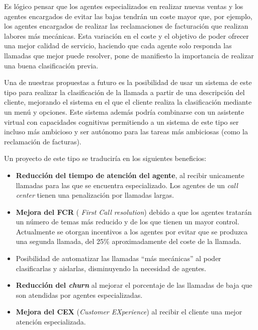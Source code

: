 Es lógico pensar que los agentes especializados en realizar nuevas ventas y los agentes encargados de evitar las bajas tendrán un coste mayor que, por ejemplo, los agentes encargados de realizar las reclamaciones de facturación que realizan labores más mecánicas. Esta variación en el coste y el objetivo de poder ofrecer una mejor calidad de servicio, haciendo que cada agente solo responda las llamadas que mejor puede resolver, pone de manifiesto la importancia de realizar una buena clasificación previa. 

Una de nuestras propuestas a futuro es la posibilidad de usar un sistema de este tipo para realizar la clasificación de la llamada a partir de una descripción del cliente, mejorando el sistema en el que el cliente realiza la clasificación mediante un menú y opciones. Este sistema además podría combinarse con un asistente virtual con capacidades cognitivas permitiendo a un sistema de este tipo ser incluso más ambicioso y ser autónomo para las tareas más ambiciosas (como la reclamación de facturas).

Un proyecto de este tipo se traduciría en los siguientes beneficios: 

\begin{itemize}
\item \textbf{Reducción del tiempo de atención del agente}, al recibir unicamente llamadas para las que se encuentra especializado. Los agentes de un \textit{call center} tienen una penalización por llamadas largas. 
\item \textbf{Mejora del FCR} ( \textit{First Call resolution}) debido a que los agentes tratarán un número de temas más reducido y de los que tienen un mayor control. Actualmente se otorgan incentivos a los agentes por evitar que se produzca una segunda llamada, del 25\% aproximadamente del coste de la llamada. 
\item Posibilidad de automatizar las llamadas ``más mecánicas'' al poder clasificarlas y aislarlas, disminuyendo la necesidad de agentes. 

\item \textbf{Reducción del \textit{churn}} al mejorar el porcentaje de las llamadas de baja que son atendidas por agentes especializadas.

\item \textbf{Mejora del CEX} (\textit{Customer EXperience}) al recibir el cliente una mejor atención especializada.



\end{itemize}

